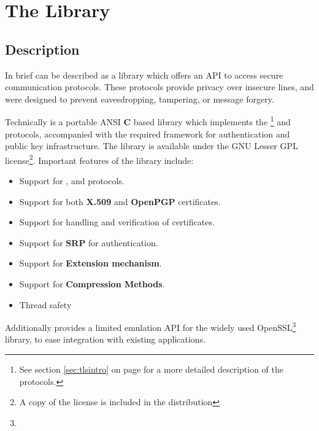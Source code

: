 \chapter{The Library}

\section{Description}
\par
In brief \gnutls{} can be described as a library which offers
an API to access secure communication protocols. These protocols provide
privacy over insecure lines, and were designed to prevent 
eavesdropping, tampering, or message forgery.

\par
Technically \gnutls{} is a portable ANSI {\bf C} based library which implements the 
\tlsI{}\footnote{See section \ref{sec:tlsintro} on page \pageref{sec:tlsintro} for
a more detailed description of the protocols.} and \sslIII{} protocols,
accompanied with the required framework for authentication and
public key infrastructure.
The library is available under the GNU Lesser GPL license\footnote{A copy of the license is included
in the distribution}.
Important features of the \gnutls{} library include:

\begin{itemize}
\item Support for \tlsI{}, \tlsII{} and \sslIII{} protocols.
\item Support for both {\bf X.509} and {\bf OpenPGP} certificates.
\item Support for handling and verification of certificates.
\item Support for {\bf SRP} for \tls{} authentication.
\item Support for \tls{} {\bf Extension mechanism}.
\item Support for \tls{} {\bf Compression Methods}.
\item Thread safety
\end{itemize}

Additionally \gnutls{} provides a limited emulation API for the widely used
OpenSSL\footnote{} 
library, to ease integration with existing applications.

